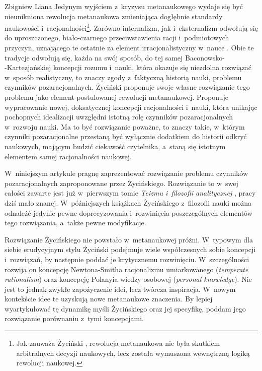 \begin{artplenv}{Zbigniew Liana}
Jedynym wyjściem z~kryzysu metanaukowego wydaje się być nieunikniona rewolucja metanaukowa zmieniająca dogłębnie standardy naukowości i~racjonalności\footnote{Jak zauważa Życiński
\parencites*[][s.~202]{zycinski_structure_1988}[][s.~352]{zycinski_struktura_2013_liana}, %
 rewolucja metanaukowa nie była skutkiem arbitralnych decyzji naukowych, lecz została wymuszona wewnętrzną logiką rewolucji naukowej.}. Zarówno internalizm, jak i~eksternalizm odwołują się do uproszczonego, biało-czarnego przeciwstawienia racji i~podmiotowych przyczyn, uznającego te ostatnie za element irracjonalistyczny w~nauce 
\parencite[][s.~227]{zycinski_teizm_1985}. %
 Obie te tradycje odwołują się, każda na swój sposób, do tej samej Baconowsko-\\-Kartezjańskiej koncepcji rozumu i~nauki, która okazuje się niezdolna rozwiązać w~sposób realistyczny, to znaczy zgody z~faktyczną historią nauki, problemu czynników pozaracjonalnych. Życiński proponuje swoje własne rozwiązanie tego problemu jako element postulowanej rewolucji metanaukowej. Proponuje wypracowanie nowej, doksatycznej koncepcji racjonalności i~nauki, która unikając pochopnych idealizacji uwzględni istotną rolę czynników pozaracjonalnych w~rozwoju nauki. Ma to być rozwiązanie poważne, to znaczy takie, w~którym czynniki pozaracjonalne przestaną być wyłącznie dodatkiem do historii odkryć naukowych, mającym budzić ciekawość czytelnika, a~staną się istotnym elementem samej racjonalności naukowej.%

W~niniejszym artykule pragnę zaprezentować rozwiązanie problemu czynników pozaracjonalnych zaproponowane przez Życińskiego. Rozwiązanie to w~swej całości zawarte jest już w~pierwszym tomie \textit{Teizmu i~filozofii analitycznej}
\parencite*[][]{zycinski_teizm_1985}, %
 pracy dziś mało znanej. W~późniejszych książkach Życińskiego z~filozofii nauki można odnaleźć jedynie pewne doprecyzowania i~rozwinięcia poszczególnych elementów tego rozwiązania, a~także pewne modyfikacje.

Rozwiązanie Życińskiego nie powstało w~metanaukowej próżni. W~typowym dla siebie erudycyjnym stylu Życiński podejmuje wiele współczesnych sobie koncepcji i~rozwiązań, by następnie poddać je krytycznemu rozwinięciu. W~szczególności rozwija on koncepcję Newtona-Smitha racjonalizmu umiarkowanego (\textit{temperate rationalism}) oraz koncepcję Polanyia wiedzy osobowej (\textit{personal knowledge}). Nie jest to jednak zwykłe zapożyczenie idei, lecz twórcza inspiracja. W~nowym kontekście idee te uzyskują nowe metanaukowe znaczenia. By lepiej wyartykułować tę dynamikę myśli Życińskiego oraz jej specyfikę, poddam jego rozwiązanie porównaniu z~tymi koncepcjami.


\end{artplenv}
